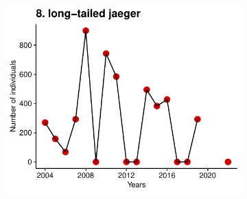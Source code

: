 \documentclass[a4paper,twoside,10pt]{article}
\begin{document}
\begin{figure}[ht]
\begin{subfigure}{0.45\textwidth}
\includegraphics[width=\linewidth]{figures/species_temporal_series/long-tailed_jaeger.pdf}
\end{subfigure}
\end{figure}
\newpage
\end{document}
